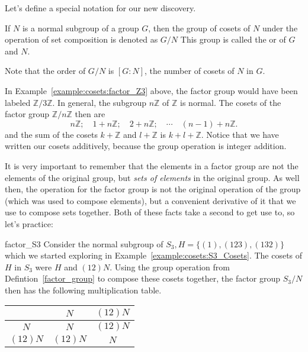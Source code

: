 {Let's define a special notation for our new discovery.

\begin{defn}\label{factor_group} 
If $N$ is a normal subgroup of a group $G$, then the group of cosets of $N$ under the operation of set composition is denoted as $G/N$\label{notefactor} This group is called the  or  of $G$ and $N$. 
\end{defn} 
Note that the order of $G/N$ is $[G:N]$, the number of cosets of $N$ in $G$. 

 

\begin{rem}
In Example~\ref{example:cosets:factor_Z3} above, the factor group would have been labeled ${\mathbb Z}/ 3 {\mathbb Z}$. In general, the subgroup $n {\mathbb Z}$ of ${\mathbb Z}$ is normal. The
cosets of the factor group ${\mathbb Z } / n {\mathbb Z}$ then are 
\[
n {\mathbb Z};\quad 1 + n {\mathbb Z}; \quad 2 + n {\mathbb Z}; \quad \cdots \quad
(n-1) + n {\mathbb Z}.
\]
and the sum of the cosets $k + {\mathbb Z}$ and $l + {\mathbb Z}$ is $k+l + 
{\mathbb Z}$. Notice that  we have written our cosets additively, 
because the group operation is integer addition. 
\end{rem}


It is very important to remember that the elements in a factor group are not the elements of the original group, but \emph{sets of elements} in the original group. As well then, the operation for the factor group is not the original operation of the group (which was used to compose elements), but a convenient derivative of it that we use to compose sets together.  Both of these facts take a second to get use to, so let's practice:

 
\begin{example}{factor_S3}
Consider the normal subgroup of $S_3, H = \{ (1), (123), (132)  \}$ which we started exploring in Example~\ref{example:cosets:S3_Cosets}.
The cosets of $H$ in $S_3$ were $H$ and $(12) N$. Using the group operation from Defintion~\ref{factor_group} to compose these cosets together, the factor group $S_3
/ N$ then has the following multiplication table.
\begin{center}
\begin{tabular}{c|cc}
         & $N$      & $(12) N$ \\
\hline
$N$      & $N$      & $(12) N$ \\
$(12) N$ & $(12) N$ & $N$
\end{tabular}
\end{center}


\end{example}}
